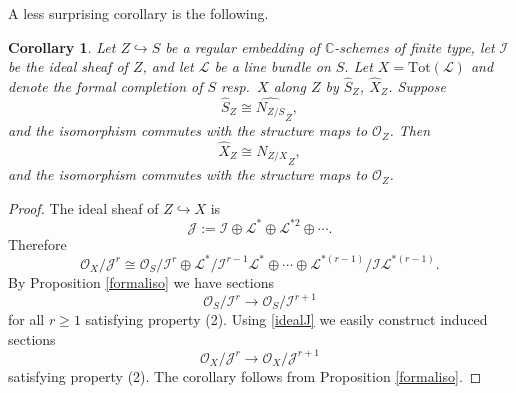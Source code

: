 \documentclass[12pt]{amsart}
\newtheorem{corollary}[theorem]{Corollary}
\theoremstyle{definition}
\theoremstyle{property}
\newcommand\I{\mathcal I}
\newcommand\J{\mathcal J}
\renewcommand\L{\mathcal L}
\renewcommand\O{\mathcal O}
\newcommand\C{\mathbb C}
\renewcommand\_{^{}_}
\begin{document}
A less surprising corollary is the following.
\begin{corollary}
Let $Z \hookrightarrow S$ be a regular embedding of $\C$-schemes of finite type, let $\I$ be the ideal sheaf of $Z$, and let $\L$ be a line bundle on $S$. Let $X = \mathrm{Tot}(\L)$ and denote the formal completion of $S$ resp.~$X$ along $Z$ by $\widehat{S}_Z$, $\widehat{X}_Z$. Suppose
$$
\widehat{S}_Z \cong \widehat{N_{Z/S}}_Z,
$$
and the isomorphism commutes with the structure maps to $\O_Z$. Then 
$$
\widehat{X}_Z \cong \widehat{N_{Z/X}}_Z,
$$
and the isomorphism commutes with the structure maps to $\O_Z$.
\end{corollary}
\begin{proof}
The ideal sheaf of $Z \hookrightarrow X$ is
$$
\J := \I \oplus \L^* \oplus \L^{*2} \oplus \cdots.
$$
Therefore 
\begin{equation} \label{idealJ}
\O_X / \J^r \cong \O_S / \I^r \oplus \L^* / \I^{r-1}\L^* \oplus \cdots \oplus \L^{*(r-1)} / \I \L^{*(r-1)}.
\end{equation}
By Proposition \ref{formaliso} we have sections 
$$
\O_S / \I^r \longrightarrow \O_S / \I^{r+1}
$$
for all $r \geq 1$ satisfying property (2). Using \eqref{idealJ} we easily construct induced sections
$$
\O_X / \J^r \longrightarrow \O_X / \J^{r+1}
$$
satisfying property (2). The corollary follows from Proposition \ref{formaliso}.
\end{proof}
\end{document}
